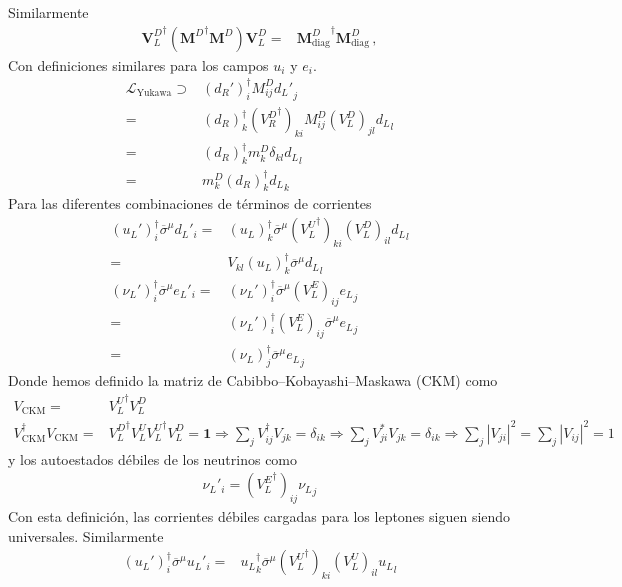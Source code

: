 \begin{frame}
 Similarmente
\begin{align}
  {\mathbf{V}_L^D}^\dagger \left({\mathbf{M}^D}^\dagger\mathbf{M}^D\right)\mathbf{V}_L^D=& 
  {\mathbf{M}^D_{\text{diag}}}^\dagger{\mathbf{M}^D_{\text{diag}}}\,,
\end{align}
Con definiciones similares para los campos $u_i$ y $e_i$.
\begin{align}
\mathcal{L}_{\text{Yukawa}}\supset&(d_R')^{\dagger}_iM^D_{ij} {d_L'}_j\nonumber\\
=&(d_R)^{\dagger}_k({V^D_R}^\dagger)_{ki}M^D_{ij}(V^D_L)_{jl} {d_L}_l\nonumber\\
=&(d_R)^{\dagger}_km^D_k\delta_{kl} {d_L}_l\nonumber\\
=&m^D_k(d_R)^{\dagger}_k{d_L}_k
\end{align}
Para las diferentes combinaciones de términos de corrientes
\begin{align}
  (u_L')^{\dagger}_i \overline{\sigma}^\mu{d_L}'_i=&(u_L)^{\dagger}_k\overline{\sigma}^\mu({V^U_L}^\dagger)_{ki}(V^D_L)_{il} {d_L}_l\nonumber\\
  =&V_{kl}(u_L)^{\dagger}_k\overline{\sigma}^\mu{d_L}_l\nonumber\\
  (\nu_L')^{\dagger}_i\overline{\sigma}^\mu {e_L}'_i=&(\nu_L')^{\dagger}_i\overline{\sigma}^\mu(V^E_L)_{ij} {e_L}_j\nonumber\\
  =&(\nu_L')^{\dagger}_i(V^E_L)_{ij}\overline{\sigma}^\mu {e_L}_j\nonumber\\
  =&(\nu_L)^{\dagger}_j\overline{\sigma}^\mu{e_L}_j
\end{align}
Donde hemos definido la matriz de Cabibbo--Kobayashi--Maskawa (CKM) como
\begin{align}
  \label{eq:230qft}
  V_{\text{CKM}}=&{V^U_L}^\dagger V^D_L\nonumber\\
  V^\dagger_{\text{CKM}} V_{\text{CKM}}=&{V^D_L}^\dagger{V^U_L}{V^U_L}^\dagger V^D_L=\mathbf{1}\Rightarrow \sum_jV^\dagger_{ij}V_{jk}=\delta_{ik}\Rightarrow\sum_jV^*_{ji}V_{jk}=\delta_{ik}\Rightarrow\sum_j|V_{ji}|^2=\sum_j|V_{ij}|^2=1
\end{align}
y los autoestados débiles de los neutrinos como
\begin{align}
  {\nu_L}'_i=({V^E_L}^\dagger)_{ij}{\nu_L}_j
\end{align}
Con esta definición, las corrientes débiles cargadas para los leptones siguen siendo universales. Similarmente
\begin{align}
   (u_L')^{\dagger}_i \overline{\sigma}^\mu{u_L}'_i=&{u_L}^{\dagger}_k\overline{\sigma}^\mu({V^U_L}^\dagger)_{ki}(V^U_L)_{il} {u_L}_l\nonumber\\

\end{align}
\end{frame}
